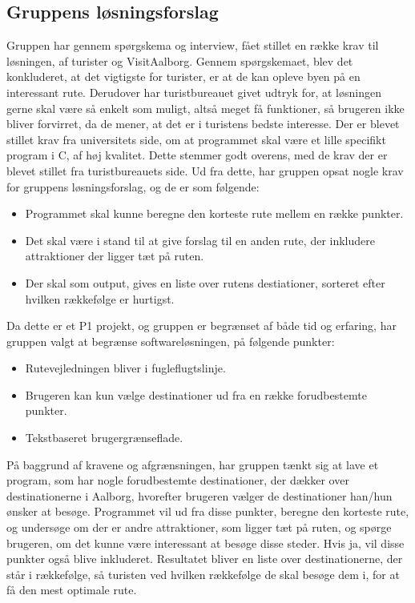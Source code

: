 \subsection{Gruppens løsningsforslag}
Gruppen har gennem spørgskema og interview, fået stillet en række krav til løsningen, af turister og VisitAalborg. 
Gennem spørgskemaet, blev det konkluderet, at det vigtigste for turister, er at de kan opleve byen på en interessant rute. 
Derudover har turistbureauet givet udtryk for, at løsningen gerne skal være så enkelt som muligt, altså meget få funktioner, så brugeren ikke bliver forvirret, da de mener, at det er i turistens bedste interesse. \newline
Der er blevet stillet krav fra universitets side, om at programmet skal være et lille specifikt program i C, af høj kvalitet. Dette stemmer godt overens, med de krav der er blevet stillet fra turistbureauets side.   \newline
Ud fra dette, har gruppen opsat nogle krav for gruppens løsningsforslag, og de er som følgende:
\begin{itemize}
	\item Programmet skal kunne beregne den korteste rute mellem en række punkter.
	\item Det skal være i stand til at give forslag til en anden rute, der inkludere attraktioner der ligger tæt på ruten.
 	\item Der skal som output, gives en liste over rutens destiationer, sorteret efter hvilken rækkefølge er hurtigst.
\end{itemize}

Da dette er et P1 projekt, og gruppen er begrænset af både tid og erfaring, har gruppen valgt at begrænse softwareløsningen, på følgende punkter: 
\begin{itemize}
	\item Rutevejledningen bliver i fugleflugtslinje.
	\item Brugeren kan kun vælge destinationer ud fra en række forudbestemte punkter.
	\item Tekstbaseret brugergrænseflade.
\end{itemize}

På baggrund af kravene og afgrænsningen, har gruppen tænkt sig at lave et program, som har nogle forudbestemte destinationer, der dækker over destinationerne i Aalborg, hvorefter brugeren vælger de destinationer han/hun ønsker at besøge. Programmet vil ud fra disse punkter, beregne den korteste rute, og undersøge om der er andre attraktioner, som ligger tæt på ruten, og spørge brugeren, om det kunne være interessant at besøge disse steder. Hvis ja, vil disse punkter også blive inkluderet. Resultatet bliver en liste over destinationerne, der står i rækkefølge, så turisten ved hvilken rækkefølge de skal besøge dem i, for at få den mest optimale rute.
